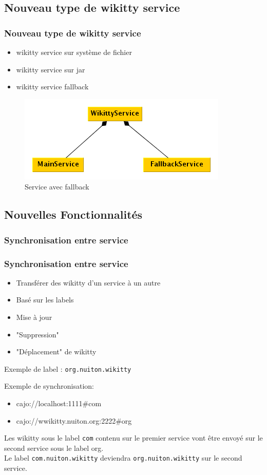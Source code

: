 \documentclass[12pt,a4paper,utf8x]{beamer}
\begin{document}
\subsection{Nouveau type de wikitty service}
\begin{frame}\frametitle{Nouveau type de wikitty service}
\begin{itemize}
\item wikitty service sur système de fichier
\item wikitty service sur jar
\item wikitty service fallback\pause
\end{itemize}\pause

\begin{figure}
\includegraphics[scale=0.5]{../image/multicontext.png} 
\caption{Service avec fallback}
\end{figure}
\end{frame}


\subsection{Nouvelles Fonctionnalités}
\subsubsection*{Synchronisation entre service}
\begin{frame}\frametitle{Synchronisation entre service}
\begin{itemize}
\item Transférer des wikitty d'un service à un autre
\item Basé sur les labels
\item Mise à jour
\item "Suppression"
\item "Déplacement" de wikitty
\end{itemize}
\pause
Exemple de label :
\verb!org.nuiton.wikitty!
\end{frame}

\begin{frame}
Exemple de synchronisation:
\begin{itemize}
\item cajo://localhost:1111\#com
\item cajo://wwikitty.nuiton.org:2222\#org
\end{itemize}

Les wikitty sous le label \verb!com! contenu sur le premier service vont
être envoyé sur le second service sous le label org.\\

Le label \verb!com.nuiton.wikitty! deviendra \verb!org.nuiton.wikitty! sur 
le second service.\\
\end{frame}
\end{document}
